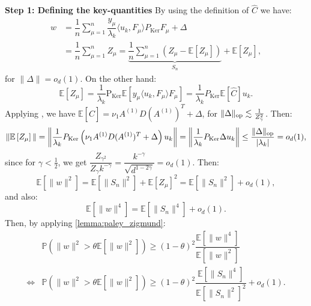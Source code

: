 \documentclass[]{article}
\numberwithin{equation}{section}
\theoremstyle{definition}
\newcommand{\EE}{\mathbb{E}}
\def\op{{\rm op}}
\begin{document}
\textbf{Step 1: Defining the key-quantities} By using the definition of $\hat{C}$ we have: 
\begin{align}
    w &=  \dfrac{1}{n} \sum_{\mu =1}^{n}\dfrac{y_\mu}{\lambda_{k}} \langle u_{k}, F_\mu \rangle P_{\mathrm{Ker}} F_{\mu} + \Delta\\
    & = \dfrac{1}{n} \sum_{\mu=1}^{n} Z_{\mu} = \underbrace{\dfrac{1}{n} \sum_{\mu = 1}^{n} (Z_\mu - \EE[Z_\mu])}_{S_n} + \EE[Z_\mu], 
\end{align}
for $\|\Delta\|=o_{d}(1)$. On the other hand: 
\begin{equation}
    \EE \left [ Z_{\mu}\right ] = \dfrac{1}{\lambda_k}\mathrm{P}_\mathrm{Ker}\EE \left [ y_\mu \langle u_k, F_\mu \rangle F_\mu \right ] = \dfrac{1}{\lambda_{k}} P_{\mathrm{Ker}}\EE \left [ \hat{C}\right ] u_k. 
\end{equation}
Applying , we have $\EE\left [ \hat{C}\right ] = \nu_1 A^{(1)}D(A^{(1)})^T + \Delta$, for $\| \Delta\|_\op \lesssim \frac{1}{Z_{\gamma}^2}$. Then: 
\begin{equation}
     \|\EE \left [ Z_{\mu}\right ]\| = \left \|\dfrac{1}{\lambda_{k}} P_{\mathrm{Ker}}\left ( \nu_1 A^{(1)}D(A^{(1)})^T  + \Delta \right )u_k\right \| = \left \| \dfrac{1}{\lambda_k} P_\mathrm{Ker} \Delta u_k \right \|\leq \dfrac{\|\Delta\|_\op}{|\lambda_k|} = o_{d}(1), 
     \label{eq:expectaiton_norm_Z_small}
\end{equation}
since for $\gamma < \frac{1}{2}$, we get $\dfrac{Z_{\gamma^2}}{Z_{\gamma} k^{-\gamma}} = \dfrac{k^{-\gamma}}{\sqrt{d^{1-2\gamma}}} = o_{d}(1)$. Then: 
\begin{equation}
    \EE[ \| w\|^2 ] = \EE \left [ \| S_{n}\|^2 \right ] + \EE[Z_\mu]^{2} = \EE \left [ \| S_{n}\|^2 \right ] + o_{d}(1),
    \label{eq:norm_w_squared}
\end{equation}
and also: 
\begin{equation}
    \EE[ \| w\|^4 ] = \EE \left [ \| S_{n}\|^4 \right ]  + o_{d}(1). 
\end{equation}
Then, by applying \ref{lemma:paley_zigmund}:
\begin{align}
    &\mathbb{P}\left ( \| w\|^2 > \theta  \EE\left [ \|w\|^2\right ]\right ) \geq (1-\theta)^2 \dfrac{\EE \left [ \|w\|^4 \right ]}{\EE \left [ \| w\|^2\right ]} \\
    \iff  &\mathbb{P}\left ( \| w\|^2 > \theta  \EE\left [ \|w\|^2\right ]\right ) \geq (1-\theta)^2 \dfrac{\EE \left [ \|S_{n}\|^4 \right ]}{\EE \left [ \| S_{n}\|^2\right ]^2} + o_{d}(1).
    \label{eq:PZ_application_1}
\end{align}
\end{document}
